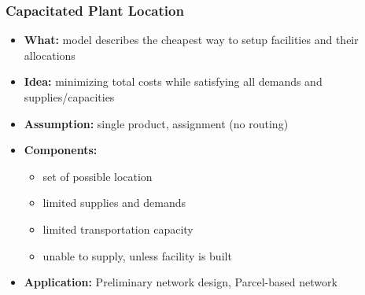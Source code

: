 \documentclass[10pt,handout,notes=show]{beamer}
\begin{document}
\begin{frame}
  \frametitle{Capacitated Plant Location }

  \begin{itemize}
    \item \textbf{What:} model describes the cheapest way to \alert{setup facilities} and \alert{their allocations}
    \item \textbf{Idea:} minimizing total costs while satisfying all demands and supplies/capacities
    \item \textbf{Assumption:} \alert{single product}, \alert{assignment} (no routing)
    \item \textbf{Components:}
    \begin{itemize}
        \item set of possible location
        \item limited supplies and demands
        \item limited transportation capacity
        \item unable to supply, unless facility is built \NextLine
    \end{itemize}
    \item \textbf{Application:} Preliminary network design, Parcel-based network
  \end{itemize}


\end{frame}
\end{document}
